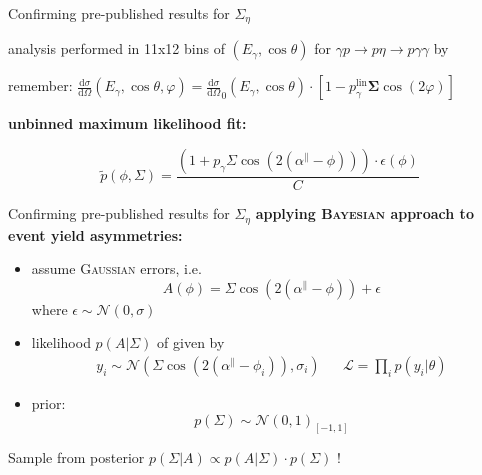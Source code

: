 \documentclass[11pt,aspectratio=169,dvipsnames]{beamer}
\newcommand{\thecolor}{black!70!blue}
\begin{document}
	\begin{frame}[noframenumbering]{Confirming pre-published results for $\Sigma_\eta$}
	
	\begin{minipage}{\linewidth}
			\begin{tcolorbox}[colback=blue!5,colframe=\thecolor,title={Event selection ($\eta$)}]
		analysis performed in 11x12 bins of $(E_\gamma,\cos\theta)$ for $\gamma p\to p\eta\to p\gamma\gamma$ by {\cites{eta}}
	\end{tcolorbox}
	\end{minipage}
	\begin{minipage}{\linewidth}
		\begin{tcolorbox}[colback=blue!5,colframe=\thecolor,title={Methods}]
			\begin{center}
				remember: $\frac{\text{d}\sigma}{\text{d}\Omega}(E_\gamma,\cos\theta,\varphi)=\frac{\text{d}\sigma}{\text{d}\Omega}_0(E_\gamma,\cos\theta)\cdot\left[1-p_\gamma^{\text{lin}}\boldsymbol{\Sigma}\cos(2\varphi)\right]$
			\end{center}
			
			
				\textbf{unbinned maximum likelihood fit:}

					$$\tilde{p}(\phi,\Sigma)=\frac{\left(1+p_\gamma\Sigma\cos\left(2\left(\alpha^\parallel-\phi\right)\right)\right)\cdot\epsilon\left(\phi\right)}{C}$$
				
			
		\end{tcolorbox}
	\end{minipage}
\end{frame}
	\begin{frame}{Confirming pre-published results for $\Sigma_\eta$}
\textbf{		applying \textsc{Bayesian} approach to event yield asymmetries:}
		\begin{itemize}
			\item assume \textsc{Gaussian} errors, i.e.
			$$A(\phi)=\Sigma\cos\left(2\left(\alpha^\parallel-\phi\right)\right)+\epsilon$$ where $\epsilon\sim\mathcal{N}(0,\sigma)$
			\item likelihood $p(A|\Sigma)$ of given by
			\begin{align*}
				y_i\sim\mathcal{N}\left(\Sigma\cos\left(2\left(\alpha^\parallel-\phi_i\right)\right),\sigma_i\right)&&\mathcal{L}=\prod_i p(y_i|\theta)
		\end{align*}
			\item prior: $$p(\Sigma)\sim\mathcal{N}(0,1)_{[-1,1]}$$
		\end{itemize}
	Sample from posterior $p(\Sigma|A)\propto p(A|\Sigma)\cdot p(\Sigma)$ !

	\end{frame}
\end{document}
